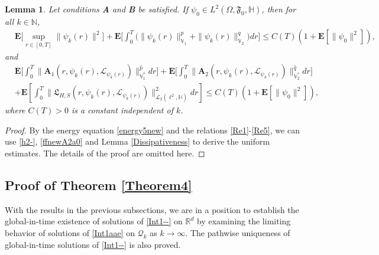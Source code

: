 \documentclass[11pt]{article}
\renewcommand{\leq}{\leqslant}
\newtheorem{lemma}[theorem]{Lemma}
\numberwithin{equation}{section}
\begin{document}
\begin{lemma}\label{ffTheorem4kk}
Let conditions {\bf A}
and {\bf B} be satisfied.
If $\psi_0\in L^{2}(\Omega,\mathfrak{F}_0,\mathbb{H})$,
then for all $k\in\mathbb{N}$,
\begin{align*}
&\mathbf{E}\bigg[\sup_{r\in[0,T]}\|\psi_k(r)
\|^{2}\bigg]
+
\mathbf{E}\bigg[\int_{0}^{T}\Big(\|\psi_k(r)
\|_{\mathbb{V}_1}^{p} +\|\psi_k(r)\|^q_{\mathbb{V}_2}\Big)
 dr\bigg]\leq  C(T) (1+\mathbf{E}[\|\psi_0\|^2]),
\end{align*}
and
\begin{align*}
&
\mathbf{E}\bigg[\int_0^{T}
\|\mathbf{A}_1(r,\psi_k(r),\mathcal{L}_{
\psi_k(r)}) \|^{\widehat{p}}_{\mathbb{V}^*_1}dr\bigg]
+
\mathbf{E}\bigg[\int_0^{T}
\|\mathbf{A}_2(r,\psi_k(r),\mathcal{L}_{
\psi_k(r)}) \|^{\widehat{q}}_{\mathbb{V}^*_2}dr\bigg]
\nonumber\\&+\mathbf{E}\left[
\int_0^{T}
\|\mathfrak{L}_{H,S}(r,\psi_k(r),\mathcal{L}_{
\psi_k(r)})
\|^2_{\mathcal{L}_2(\ell^2,
\mathbb{H})}dr
\right]
\le  C(T) (1+\mathbf{E}[\|\psi_0\|^2]),
\end{align*}
where $C(T)>0$ is a constant independent of $k$.






\end{lemma}
\begin{proof}
By the energy equation \eqref{energy5new} and the relations \eqref{Re1}-\eqref{Re5}, we can use \eqref{h2-}, \eqref{ffnewA2a0} and Lemma
\ref{Dissipativeness} to derive the uniform
estimates.
The details of the proof  are  omitted here.
\end{proof}















\subsection{Proof of Theorem \ref{Theorem4}}
With the results in
the previous subsections, we are in a
 position to establish the global-in-time existence of solutions of \eqref{Int1--}  on $\mathbb{R}^d$ by examining the
limiting behavior of solutions
of \eqref{Int1aae} on $\mathcal{Q}_{k}$ as $k\rightarrow\infty$. The pathwise uniqueness of global-in-time solutions of \eqref{Int1--} is also proved.
\end{document}
